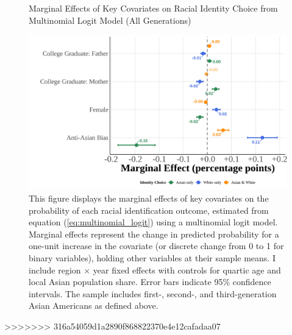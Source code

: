 \begin{center}
\begin{figure}[!htb]
\centering
\caption{Marginal Effects of Key Covariates on Racial Identity Choice from Multinomial Logit Model (All Generations)}
\label{fig:marginal-effects-all}
\includegraphics[width=0.9\linewidth]{optimized_marginal_effects_all.png}
\caption*{\footnotesize{This figure displays the marginal effects of key covariates on the probability of each racial identification outcome, estimated from equation (\ref{eq:multinomial_logit}) using a multinomial logit model. Marginal effects represent the change in predicted probability for a one-unit increase in the covariate (or discrete change from 0 to 1 for binary variables), holding other variables at their sample means. I include region $\times$ year fixed effects with controls for quartic age and local Asian population share. Error bars indicate 95\% confidence intervals. The sample includes first-, second-, and third-generation Asian Americans as defined above.}}
\end{figure}
\end{center}
>>>>>>> 316a54059d1a2890f868822370e4e12cafadaa07

\pagebreak
\newpage


